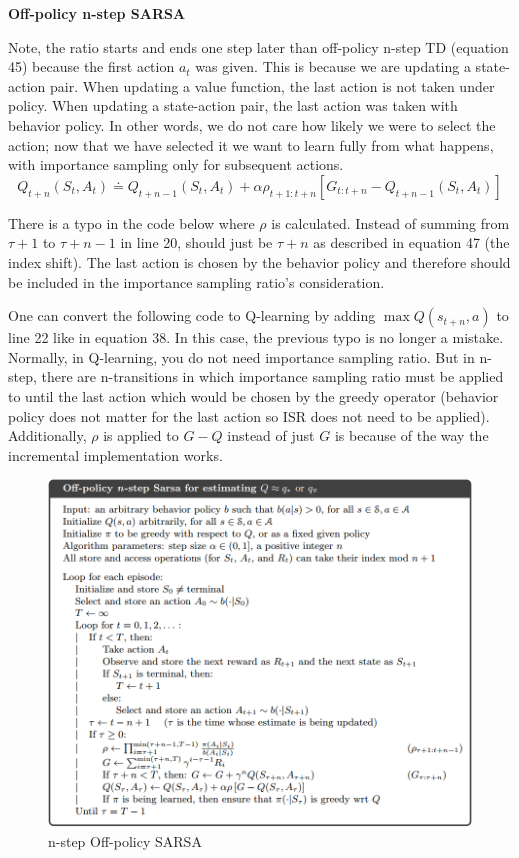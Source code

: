 \documentclass{article}
\begin{document}
\noindent
\textbf{Off-policy n-step SARSA}

\noindent
Note, the ratio starts and ends one step later than off-policy n-step TD
(equation 45) because the first action $a_{t}$ was given. This is because we are
updating a state-action pair. When updating a value function, the last action is
not taken under policy. When updating a state-action pair, the last action was
taken with behavior policy. In other words, we do not care how likely we were to
select the action; now that we have selected it we want to learn fully from what
happens, with importance sampling only for subsequent actions.
\begin{equation}
Q_{t+n}\left(S_{t}, A_{t}\right) \doteq Q_{t+n-1}\left(S_{t}, A_{t}\right)+\alpha \rho_{t+1: t+n}\left[G_{t: t+n}-Q_{t+n-1}\left(S_{t}, A_{t}\right)\right]
\end{equation}

\noindent
There is a typo in the code below where $\rho$ is calculated. Instead of summing
from $\tau + 1$ to $\tau + n -1$ in line 20, should just be $\tau + n$ as
described in equation 47 (the index shift). The last action is chosen by the
behavior policy and therefore should be included in the importance sampling
ratio's consideration.

One can convert the following code to Q-learning by adding $\max Q(s_{t+n}, a)$
to line 22 like in equation 38. In this case, the previous typo is no longer a
mistake. Normally, in Q-learning, you do not need importance sampling ratio. But
in n-step, there are n-transitions in which importance sampling ratio must be
applied to until the last action which would be chosen by the greedy operator
(behavior policy does not matter for the last action so ISR does not need to be
applied). Additionally, $\rho$ is applied to $G - Q$ instead of just $G$ is
because of the way the incremental implementation works.

\begin{figure}[h]
\includegraphics[scale=0.35]{nstep_offpolicy_sarsa}
\centering
\caption{n-step Off-policy SARSA}
\end{figure}
\end{document}
